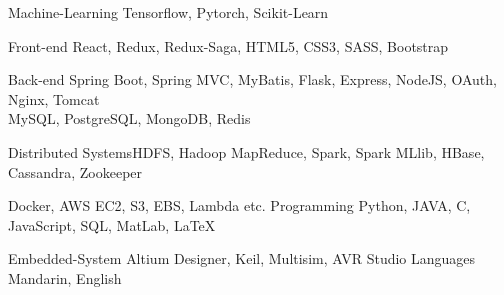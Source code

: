 

\begin{cvskills}

  \cvskill
    {Machine-Learning} %
    {Tensorflow, Pytorch, Scikit-Learn} %

  \cvskill
    {Front-end} %
    {React, Redux, Redux-Saga, HTML5, CSS3, SASS, Bootstrap} %

  \cvskill
    {Back-end} %
    {Spring Boot, Spring MVC, MyBatis, Flask, Express, NodeJS, OAuth, Nginx, Tomcat \\ MySQL, PostgreSQL, MongoDB, Redis} %

  \cvskill
    {Distributed Systems}{HDFS, Hadoop MapReduce, Spark, Spark MLlib, HBase, Cassandra, Zookeeper}

    {Docker, AWS EC2, S3, EBS, Lambda etc.}
  \cvskill
    {Programming} %
    {Python, JAVA, C, JavaScript, SQL, MatLab, LaTeX} %

  \cvskill
    {Embedded-System}
    {Altium Designer, Keil, Multisim, AVR Studio}
  \cvskill
    {Languages} %
    {Mandarin, English} %

\end{cvskills}
